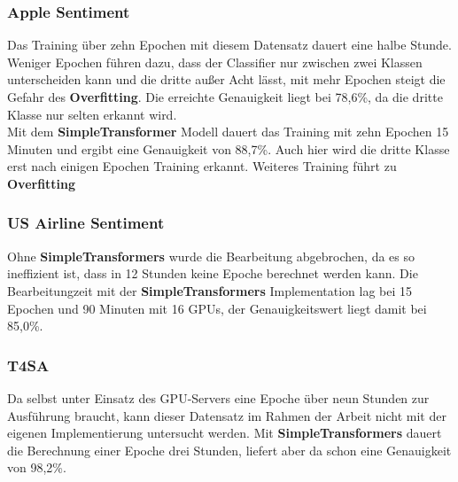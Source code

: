 \subsubsection*{Apple Sentiment}
Das Training \"uber zehn Epochen mit diesem Datensatz dauert eine halbe Stunde. Weniger Epochen f\"uhren dazu, dass der Classifier nur zwischen zwei Klassen unterscheiden kann und die dritte au{\ss}er Acht l\"asst, mit mehr Epochen steigt die Gefahr des \textbf{Overfitting}. Die erreichte Genauigkeit liegt bei 78,6\%, da die dritte Klasse nur selten erkannt wird.\\
Mit dem \textbf{SimpleTransformer} Modell dauert das Training mit zehn Epochen 15 Minuten und ergibt eine Genauigkeit von 88,7\%. Auch hier wird die dritte Klasse erst nach einigen Epochen Training erkannt. Weiteres Training f\"uhrt zu \textbf{Overfitting}

\subsubsection*{US Airline Sentiment}
Ohne \textbf{SimpleTransformers} wurde die Bearbeitung abgebrochen, da es so ineffizient ist, dass in 12 Stunden keine Epoche berechnet werden kann.
Die Bearbeitungzeit mit der \textbf{SimpleTransformers} Implementation lag bei 15 Epochen und 90 Minuten mit 16 GPUs, der Genauigkeitswert liegt damit bei 85,0\%.

\subsubsection*{T4SA}
Da selbst unter Einsatz des GPU-Servers eine Epoche \"uber neun Stunden zur Ausf\"uhrung braucht, kann dieser Datensatz im Rahmen der Arbeit nicht mit der eigenen Implementierung untersucht werden.
Mit \textbf{SimpleTransformers} dauert die Berechnung einer Epoche drei Stunden, liefert aber da schon eine Genauigkeit von 98,2\%.


